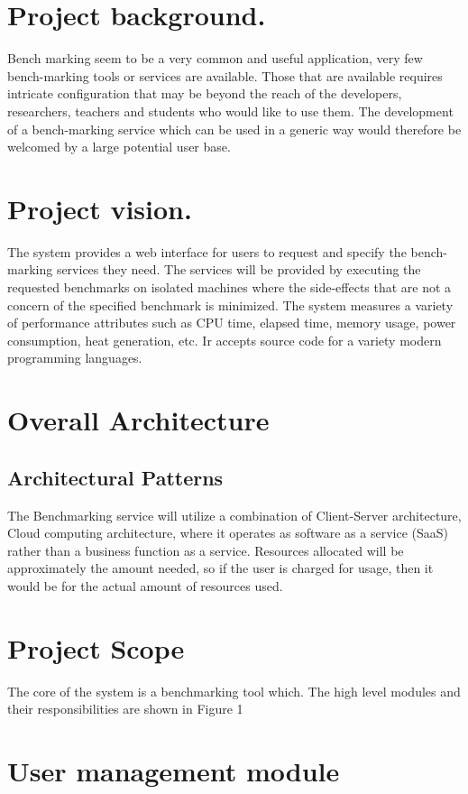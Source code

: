 \documentclass[runningheads,a4paper]{article}
\begin{document}
\section{Project background.}
Bench marking seem to be a very common and useful application, very few bench-marking tools or services are available. Those that are available requires intricate configuration that may be beyond the reach of the developers, researchers,
teachers and students who would like to use them. The development of a bench-marking service which can be used in a generic way would therefore be welcomed by a large
potential user base.

\section{Project vision.}
The system provides a web interface for users to request and specify the bench-marking services they need. The services will be provided by executing the requested benchmarks on isolated machines where the side-effects that are not a concern of the specified benchmark is minimized. The system measures a variety of performance attributes such as CPU time, elapsed time, memory usage, power consumption, heat generation, etc. Ir accepts source code for a variety modern programming languages.

\section{Overall Architecture}
\subsection{Architectural Patterns}
The Benchmarking service will utilize a combination of Client-Server architecture, Cloud computing architecture, where it operates as software as a service (SaaS) rather than a business function as a service. Resources allocated will be approximately the amount needed, so if the user is charged for usage, then it would be for the actual amount of resources used.\\


\section{Project Scope}
The core of the system is a benchmarking tool which. The high level modules and their responsibilities are
shown in Figure 1

\section{User management module}
\end{document}
